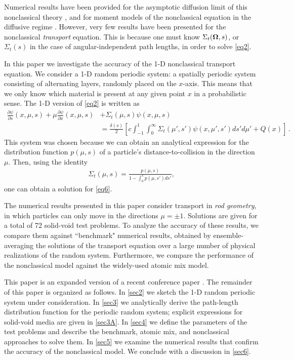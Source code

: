 \documentclass[12pt]{article}
\newcommand{\uomega}{{\bf \Omega}}
\begin{document}
Numerical results have been provided for the asymptotic diffusion limit of this nonclassical theory \cite{larvas11,vaslar09,vas13,vaslar14b}, and for moment models of the nonclassical equation in the diffusive regime \cite{kry13}.
However, very few results have been presented for the nonclassical \textit{transport} equation.
This is because one must know $\Sigma_t(\uomega,s)$, or $\Sigma_t(s)$ in the case of angular-independent path lengths, in order to solve \cref{eq2}. 

In this paper we investigate the accuracy of the 1-D nonclassical transport equation.
We consider a 1-D random periodic system: a spatially periodic system consisting of alternating layers, randomly placed on the $x$-axis.
This means that we only know which material is present at any given point $x$ in a probabilistic sense.
The 1-D version of \cref{eq2} is written as
\begin{align}\label{eq6}
\frac{\partial\psi}{\partial s}(x,\mu,s) + \mu\frac{\partial \psi}{\partial x}(x,\mu,s) &+ \Sigma_t(\mu,s)\psi(x,\mu,s) 
\\& = \frac{\delta(s)}{2}\left[ c\int_{-1}^1\int_0^\infty \Sigma_t(\mu',s')\psi(x,\mu',s')ds' d\mu' + Q(x) \right]\,. \nonumber
\end{align}
This system was chosen because we can obtain an analytical expression for the distribution function $p(\mu,s)$ of a particle's distance-to-collision in the direction $\mu$.
Then, using the identity \cite{vaslar14a}
\begin{align}\label{eq7}
\Sigma_t(\mu,s)=\frac{p(\mu,s)}{1-\int_0^sp(\mu,s')ds'},
\end{align}
one can obtain a solution for \cref{eq6}.

The numerical results presented in this paper consider transport in {\em rod geometry}, in which particles can only move in the directions $\mu = \pm 1$.
Solutions are given for a total of 72 solid-void test problems.
To analyze the accuracy of these results, we compare them against ``benchmark" numerical results, obtained by ensemble-averaging the solutions of the transport equation over a large number of physical realizations of the random system.
Furthermore, we compare the performance of the nonclassical model against the widely-used atomic mix model.

This paper is an expanded version of a recent conference paper \cite{mc15}.
The remainder of this paper is organized as follows.
In \cref{sec2} we sketch the 1-D random periodic system under consideration.
In \cref{sec3} we analytically derive the path-length distribution function for the periodic random system; explicit expressions for solid-void media are given in \cref{sec3A}.
In \cref{sec4} we define the parameters of the test problems and describe the benchmark, atomic mix, and nonclassical approaches to solve them.
In \cref{sec5} we examine the numerical results that confirm the accuracy of the nonclassical model.
We conclude with a discussion in \cref{sec6}.
\end{document}
